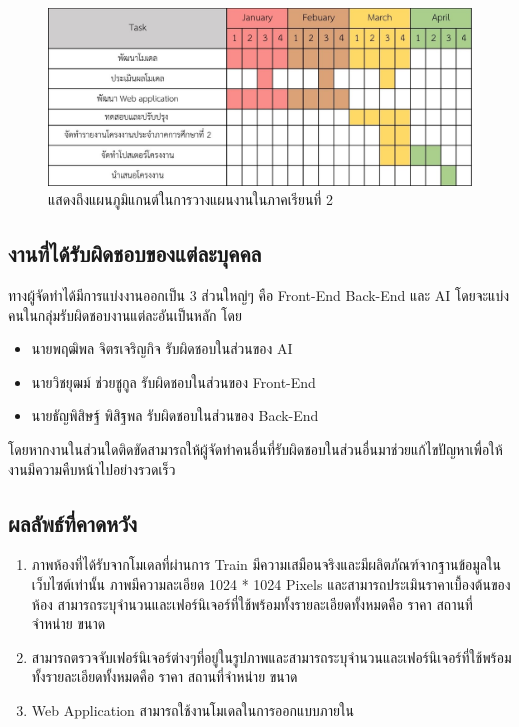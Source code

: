 \documentclass[12pt,oneside,openright,a4paper]{cpe-thai-project}
\begin{document}
\begin{figure}[!h]\centering
\includegraphics[width=13.8cm]{image/gantt-chart-2.jpg}
\caption{แสดงถึงแผนภูมิแกนต์ในการวางแผนงานในภาคเรียนที่ 2}
\label{fig:gantt-chart}
\end{figure}

\subsection{งานที่ได้รับผิดชอบของแต่ละบุคคล}

\hspace {18pt} ทางผู้จัดทำได้มีการแบ่งงานออกเป็น 3 ส่วนใหญ่ๆ คือ Front-End Back-End และ AI โดยจะแบ่งคนในกลุ่มรับผิดชอบงานแต่ละอันเป็นหลัก โดย

\begin{itemize}
\item นายพฤฒิพล จิตรเจริญกิจ รับผิดชอบในส่วนของ AI
\item นายวิชยุฒม์ ช่วยชูกูล รับผิดชอบในส่วนของ Front-End 
\item นายธัญพิสิษฐ์ พิสิฐพล รับผิดชอบในส่วนของ Back-End 
\end{itemize}

โดยหากงานในส่วนใดติดขัดสามารถให้ผู้จัดทำคนอื่นที่รับผิดชอบในส่วนอื่นมาช่วยแก้ไขปัญหาเพื่อให้งานมีความคืบหน้าไปอย่างรวดเร็ว

\subsection{ผลลัพธ์ที่คาดหวัง}

\begin{enumerate}
\item ภาพห้องที่ได้รับจากโมเดลที่ผ่านการ Train มีความเสมือนจริงและมีผลิตภัณฑ์จากฐานข้อมูลในเว็บไซต์เท่านั้น ภาพมีความละเอียด 1024 * 1024 Pixels และสามารถประเมินราคาเบื้องต้นของห้อง สามารถระบุจำนวนและเฟอร์นิเจอร์ที่ใช้พร้อมทั้งรายละเอียดทั้งหมดคือ ราคา สถานที่จำหน่าย ขนาด  
\item สามารถตรวจจับเฟอร์นิเจอร์ต่างๆที่อยู่ในรูปภาพและสามารถระบุจำนวนและเฟอร์นิเจอร์ที่ใช้พร้อมทั้งรายละเอียดทั้งหมดคือ ราคา สถานที่จำหน่าย ขนาด   
\item Web Application สามารถใช้งานโมเดลในการออกแบบภายใน 
\end{enumerate}
\end{document}
